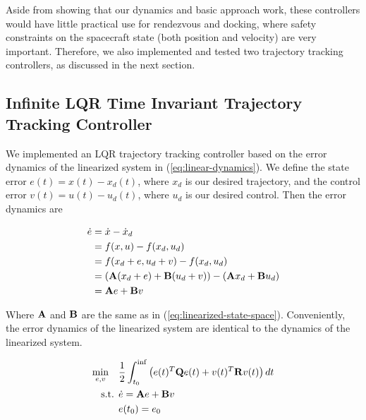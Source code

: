 \documentclass[conference]{IEEEtran}
\begin{document}
Aside from showing that our dynamics and basic approach work, these controllers
would have little practical use for rendezvous and docking, where safety
constraints on the spacecraft state (both position and velocity) are very
important. Therefore, we also implemented and tested two trajectory tracking
controllers, as discussed in the next section.


\subsection{Infinite LQR Time Invariant Trajectory Tracking Controller}

We implemented an LQR trajectory tracking controller based on the error
dynamics of the linearized system in (\ref{eq:linear-dynamics}). 
We define the state error $e(t) = x(t) - x_d(t)$, where $x_d$ is our desired
trajectory, and the control error $v(t) = u(t) - u_d(t)$, where $u_d$ is our
desired control. Then the error dynamics are

\begin{equation}
    \label{eq:linearize-error-dynamics}
    \begin{split}
        \dot{e} & = \dot{x} - \dot{x}_d \\
                & = f(x, u) - f(x_d, u_d) \\
                & = f(x_d + e, u_d + v) - f(x_d, u_d) \\
                & = ({\bf A}(x_d + e) + {\bf B}(u_d + v)) - ({\bf A}x_d +
                    {\bf B}u_d) \\
                & = {\bf A}e + {\bf B}v
    \end{split}
\end{equation}

Where ${\bf A}$ and ${\bf B}$ are the same as in
(\ref{eq:linearized-state-space}). Conveniently, the error dynamics of the
linearized system are identical to the dynamics of the linearized system.

\begin{equation}
    \label{eq:inv-linear-track-infinite-lqr}
    \begin{split}
        \min_{e, v} \ \ \  & \frac{1}{2} \int_{t_0}^{\inf} \left( e(t)^T {\bf Q}
            e(t) + v(t)^T {\bf R} v(t) \right)dt \\
        \text{s.t.   } & \dot{e} = {\bf{A}}e + {\bf B}v \\
                     & e(t_0) = e_0
    \end{split}
\end{equation}
\end{document}
